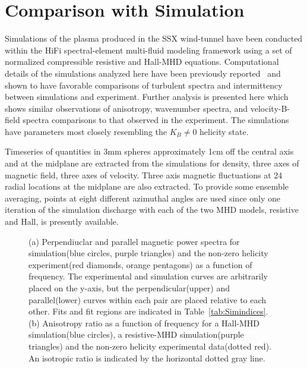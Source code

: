 \documentclass[preprint2]{aastex}
\begin{document}
\section{Comparison with Simulation}\label{sec:simulation}

Simulations of the plasma produced in the SSX wind-tunnel have been conducted within the HiFi spectral-element multi-fluid modeling framework using a set of normalized compressible resistive and Hall-MHD equations. Computational details of the simulations analyzed here have been previously reported~\citep{sch14a} and shown to have favorable comparisons of turbulent spectra and intermittency between simulations and experiment. Further analysis is presented here which shows similar observations of anisotropy, wavenumber spectra, and velocity-B-field spectra comparisons to that observed in the experiment. The simulations have parameters most closely resembling the $K_{B}\neq 0$ helicity state. 

Timeseries of quantities in 3mm spheres approximately 1cm off the central axis and at the midplane are extracted from the simulations for density, three axes of magnetic field, three axes of velocity. Three axis magnetic fluctuations at 24 radial locations at the midplane are also extracted. To provide some ensemble averaging, points at eight different azimuthal angles are used since only one iteration of the simulation discharge with each of the two MHD models, resistive and Hall, is presently available.

\begin{figure}
\caption{\label{fig:aniso_comp} (a) Perpendiuclar and parallel magnetic power spectra for simulation(blue circles, purple triangles) and the non-zero helicity experiment(red diamonds, orange pentagons) as a function of frequency. The experimental and simulation curves are arbitrarily placed on the y-axis, but the perpendicular(upper) and parallel(lower) curves within each pair are placed relative to each other. Fits and fit regions are indicated in Table~\ref{tab:Simindices}. (b) Anisotropy ratio as a function of frequency for a Hall-MHD simulation(blue circles), a resistive-MHD simulation(purple triangles) and the non-zero helicity experimental data(dotted red). An isotropic ratio is indicated by the horizontal dotted gray line.}
\end{figure}
\end{document}
